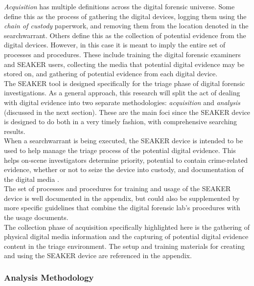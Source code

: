 \documentclass[12pt]{article}
\begin{document}
{\em Acquisition} has multiple definitions across the digital forensic universe.
Some define this as the process of gathering the digital devices, logging them using the 
{\em chain of custody} paperwork, and removing them from the location denoted in the
\gls{searchwarrant}.  Others define this as the collection of potential evidence from the digital
devices.  However, in this case it is meant to imply the entire set of processes and
procedures.  These include training the digital forensic examiners and SEAKER users, 
collecting the media that potential digital evidence may be stored on, and
gathering of potential evidence from each digital device.\\

The SEAKER tool is designed specifically for the triage phase of digital forensic
investigations.  As a general approach, this research will split the act of dealing with digital evidence into two
separate methodologies: {\em acquisition} and {\em analysis} (discussed in the next section).
These are the main foci since the SEAKER
device is designed to do both in a very timely fashion, with comprehensive searching results.\\

When a \gls{searchwarrant} is being executed, the SEAKER device is intended to be used to help
manage the triage process of the potential digital evidence.  This helps on-scene investigators
determine priority, potential to contain crime-related evidence, whether or not to seize the
device into custody, and documentation of the digital media \cite{hitchcock2016tiered}.\\ 

The set of processes and procedures for training and usage of the SEAKER device is well
documented in the appendix, but could also be supplemented by more specific guidelines that
combine the digital forensic lab's procedures with the usage documents.\\

The collection phase of acquisition specifically highlighted here is the gathering
of physical digital media information and the capturing of potential digital evidence content
in the triage environment.  The setup and training materials for creating and using the
SEAKER device are referenced in the appendix.\\

\subsubsection{Analysis Methodology}
\end{document}
